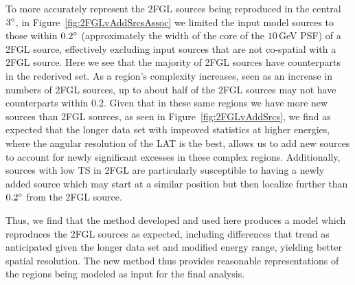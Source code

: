 {To more accurately represent the 2FGL sources being reproduced in the central $3\mbox{$^\circ$}$, in Figure~\ref{fig:2FGLvAddSrcsAssoc} we limited the input model sources to those within $0.2\mbox{$^\circ$}$ (approximately the width of the core of the $10$\,GeV PSF) of a 2FGL source, effectively excluding input sources that are not co-spatial with a 2FGL source. Here we see that the majority of 2FGL sources have counterparts in the rederived set. 
As a region's complexity increases, seen as an increase in numbers of 2FGL sources, up to about half of the 2FGL sources may not have counterparts within $0.2$\degr. Given that in these same regions we have more new sources than 2FGL sources, as seen in Figure~\ref{fig:2FGLvAddSrcs}, we find as expected that the longer data set with improved statistics at higher energies, where the angular resolution of the LAT is the best, allows us to add new sources to account for newly significant excesses in these complex regions. 
Additionally, sources with low TS in 2FGL are particularly susceptible to having a newly added source which may start at a similar position but then localize further than $0.2\mbox{$^\circ$}$ from the 2FGL source. 

Thus, we find that the method developed and used here produces a model which reproduces the 2FGL sources as expected, including differences that trend as anticipated given the longer data set and modified energy range, yielding better spatial resolution. The new method thus provides reasonable representations of the regions being modeled as input for the final analysis.



}

